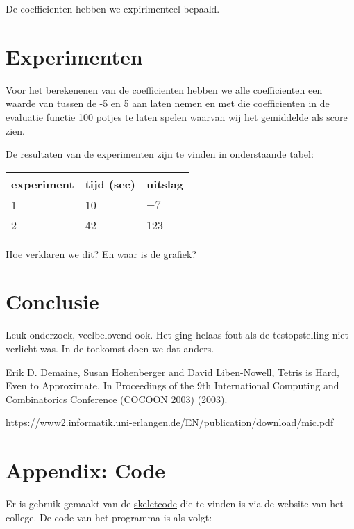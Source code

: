 \documentclass[10pt]{article}
\begin{document}
De coefficienten hebben we expirimenteel bepaald.

\section{Experimenten}

Voor het berekenenen van de coefficienten hebben we alle coefficienten een waarde van tussen de -5 en 5 aan laten nemen en met die coefficienten in de evaluatie functie 100 potjes te laten spelen waarvan wij het gemiddelde als score zien.


De resultaten van de experimenten zijn te
vinden in onderstaande tabel:

\begin{center}
\begin{tabular}{l|l|l}
experiment & tijd (sec) & uitslag\\
\hline
1 & 10 & $-7$\\
2 & 42 & 123
\end{tabular}
\end{center}
Hoe verklaren we dit? En waar is de grafiek?

\section{Conclusie}

Leuk onderzoek, veelbelovend ook. Het ging helaas 
fout als de testopstelling niet verlicht was.
In de toekomst doen we dat anders.

\begin{thebibliography}{XX}

Erik D. Demaine, Susan Hohenberger and David Liben-Nowell, Tetris is
Hard, Even to Approximate. In Proceedings of the 9th International Computing and
Combinatorics Conference (COCOON 2003) (2003).

https://www2.informatik.uni-erlangen.de/EN/publication/download/mic.pdf

\end{thebibliography}

\section*{Appendix: Code}

Er is gebruik gemaakt van de \href{http://www.liacs.leidenuniv.nl/~kosterswa/AI/iets.cc}{\underline{skeletcode}} die te vinden is via
de website van het college.
De code van het programma is als volgt:

\smallskip
\end{document}
